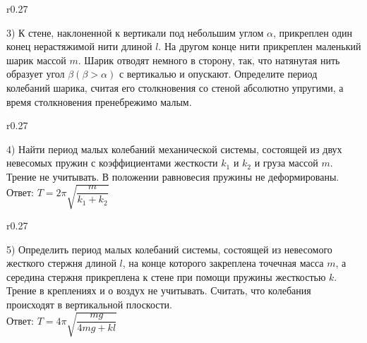 \documentclass[a4paper,12pt]{article} %
\begin{document}
\begin{wrapfigure}{r}{0.27\textwidth}
	\vspace{-5ex}
	
	\vspace{-10ex}
\end{wrapfigure}
3) К стене, наклоненной к вертикали под небольшим углом $\alpha$, прикреплен
один конец нерастяжимой нити длиной $l$. На другом конце нити прикреплен
маленький шарик массой $m$. Шарик отводят немного в сторону, так, что натянутая
нить образует угол $\beta(\beta > \alpha)$ с вертикалью и опускают. Определите
период колебаний шарика, считая его столкновения со стеной абсолютно упругими, а
время столкновения пренебрежимо малым. 

\begin{wrapfigure}{r}{0.27\textwidth}
	\vspace{-3ex}
	
	\vspace{-5ex}
\end{wrapfigure}
4) Найти период малых колебаний механической системы, состоящей из двух невесомых
пружин с коэффициентами жесткости $k_1$ и $k_2$ и груза массой $m$. Трение не
учитывать. В положении равновесия пружины не деформированы.\\
Ответ: $T=2\pi\sqrt{\dfrac{m}{k_1+k_2}}$

\begin{wrapfigure}{r}{0.27\textwidth}
	\vspace{-3ex}
	
	\vspace{-10ex}
\end{wrapfigure}
5) Определить период малых колебаний системы, состоящей из невесомого жесткого
стержня длиной $l$, на конце которого закреплена точечная масса $m$, а середина
стержня прикреплена к стене при помощи пружины жесткостью $k$. Трение в креплениях
и о воздух не учитывать. Считать, что колебания происходят в вертикальной плоскости. \\
Ответ: $T = 4\pi\sqrt{\dfrac{mg}{4mg+kl}}$
\end{document}
